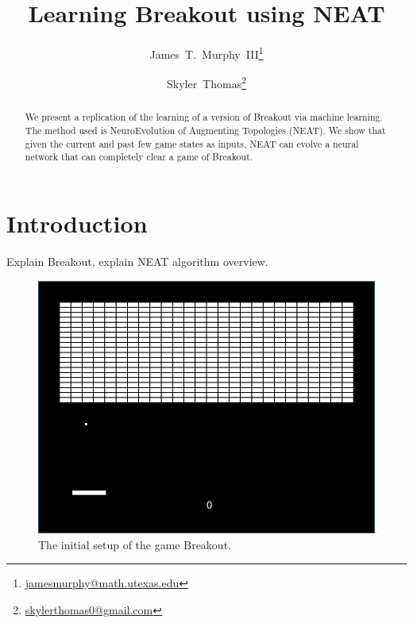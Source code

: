 \documentclass[letterpaper, twocolumn, conference]{article}
\author{James~T.~Murphy~III\thanks{\url{jamesmurphy@math.utexas.edu}}\and{}Skyler~Thomas\thanks{\url{skylerthomas0@gmail.com}}}
\title{Learning Breakout using NEAT}
\begin{document}
\maketitle{}
\begin{abstract}
    We present a replication of the learning of a version of
    Breakout via machine learning.
    The method used is NeuroEvolution of Augmenting Topologies (NEAT).
    We show that given the current and past few game states as inputs, NEAT
    can evolve a neural network that can completely clear a game of Breakout.
\end{abstract}

\section{Introduction}

Explain Breakout, explain NEAT algorithm overview.

\begin{figure}[h!]
    \centering
    \includegraphics[width=.45\textwidth]{breakout.png}
    \caption{The initial setup of the game Breakout.}
\end{figure}
\end{document}
